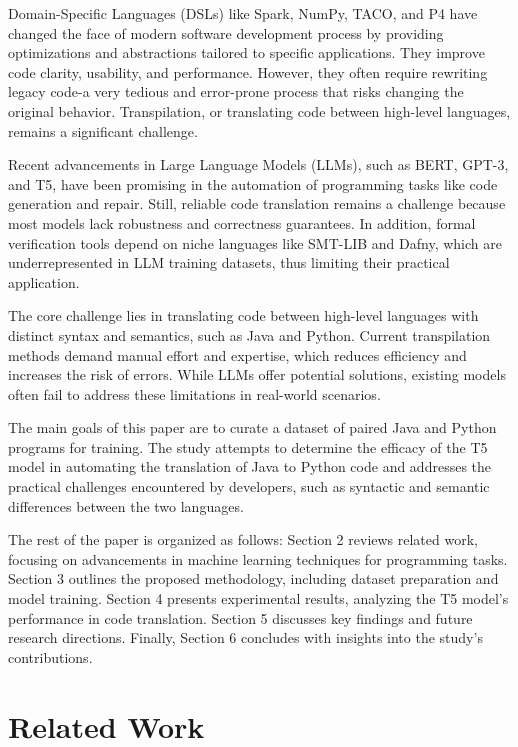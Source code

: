 \documentclass{dhbenelux}
\begin{document}
Domain-Specific Languages (DSLs) like Spark, NumPy, TACO, and P4 have changed the face of modern software development process by providing optimizations and abstractions tailored to specific applications. They improve code clarity, usability, and performance. However, they often require rewriting legacy code-a very tedious and error-prone process that risks changing the original behavior. Transpilation, or translating code between high-level languages, remains a significant challenge.

Recent advancements in Large Language Models (LLMs), such as BERT, GPT-3, and T5, have been promising in the automation of programming tasks like code generation and repair. Still, reliable code translation remains a challenge because most models lack robustness and correctness guarantees. In addition, formal verification tools depend on niche languages like SMT-LIB and Dafny, which are underrepresented in LLM training datasets, thus limiting their practical application.

The core challenge lies in translating code between high-level languages with distinct syntax and semantics, such as Java and Python. Current transpilation methods demand manual effort and expertise, which reduces efficiency and increases the risk of errors. While LLMs offer potential solutions, existing models often fail to address these limitations in real-world scenarios.

The main goals of this paper are to curate a dataset of paired Java and Python programs for training. The study attempts to determine the efficacy of the T5 model in automating the translation of Java to Python code and addresses the practical challenges encountered by developers, such as syntactic and semantic differences between the two languages.

The rest of the paper is organized as follows: Section 2 reviews related work, focusing on advancements in machine learning techniques for programming tasks. Section 3 outlines the proposed methodology, including dataset preparation and model training. Section 4 presents experimental results, analyzing the T5 model's performance in code translation. Section 5 discusses key findings and future research directions. Finally, Section 6 concludes with insights into the study's contributions.

\section{Related Work}
\end{document}
